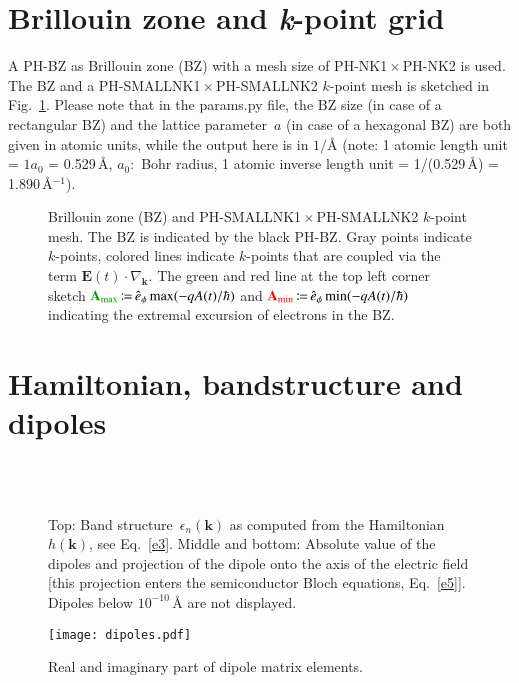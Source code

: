 \documentclass[11pt, a4paper]{scrartcl}
\newlength\figureheight
\newlength\figurewidth
\newcommand{\bE}{\mathbf{E}}
\newcommand{\bk}{\mathbf{k}}
\newcommand{\bA}{\mathbf{A}}
\newcommand{\coloneqqt}{\,{\coloneqq}\,}
\begin{document}
\section{Brillouin zone and \textit{k}-point grid}
A PH-BZ as Brillouin zone (BZ) with a mesh size of PH-NK1\,$\times$\,PH-NK2 is used. 
%
The BZ and a PH-SMALLNK1\,$\times$\,PH-SMALLNK2 $k$-point mesh is sketched in Fig.~\ref{fig:kp}.
%
Please note that in the params.py file, the BZ size (in case of a rectangular BZ) and the lattice parameter~$a$ (in case of a hexagonal BZ) are both given in atomic units, while the output here is in $1/${\AA} (note: 1 atomic length unit = $1 a_0$ = 0.529\,\AA, $a_0$:~Bohr radius, 1 atomic inverse length unit = 1/(0.529\,\AA) = 1.890\,\AA$^{-1}$). 
%
\begin{figure}
\centering
\setlength{} 
\setlength{}

\caption{Brillouin zone (BZ) and PH-SMALLNK1\,$\times$\,PH-SMALLNK2 $k$-point mesh.
%
The BZ is indicated by the black PH-BZ.
%
Gray points indicate $k$-points, colored lines indicate $k$-points that are coupled via  the term $\bE(t)\cdot \nabla_\bk$.
%
The green and red line at the top left corner sketch ${\color{darkgreen}\bA_\text{max}}\coloneqqt\hat{e}_\phi\max (-qA(t)/\hbar)$ and ${\color{red}\bA_\text{min}}\coloneqqt\hat{e}_\phi\min (-qA(t)/\hbar)$ indicating the extremal excursion of  electrons in the BZ.  
}
    \label{fig:kp}
\end{figure}


\section{Hamiltonian, bandstructure and dipoles}
\begin{figure}
\centering
\setlength\figureheight{6.5cm} 
\setlength\figurewidth{\textwidth}

\\[2em]

\\[2em]

\caption{Top: Band structure~$\epsilon_n(\bk)$ as computed from the Hamiltonian~$h(\bk)$, see Eq.~\eqref{e3}. 
%
Middle and bottom: Absolute value of the dipoles and projection of the dipole onto the axis of the electric field [this projection enters the semiconductor Bloch equations, Eq.~\eqref{e5}].
%
Dipoles below $10^{-10}$\,{\AA} are not displayed.
}
    \label{fig:bandstructuredipole}
\end{figure}

\begin{figure}
    \centering
    \texttt{[image: dipoles.pdf]}
    \caption{Real and imaginary part of dipole matrix elements.}
    \label{fig:dipoles}
\end{figure}
\end{document}
